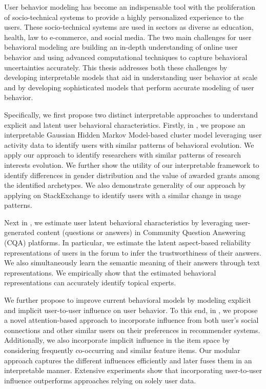 User behavior modeling has become an indispensable tool with the proliferation of socio-technical systems to provide a highly personalized experience to the users. These socio-technical systems are used in sectors as diverse as education, health, law to e-commerce, and social media.
The two main challenges for user behavioral modeling are building an in-depth understanding of online user behavior and using advanced computational techniques to capture behavioral uncertainties accurately.
This thesis addresses both these challenges by developing interpretable models that aid in understanding user behavior at scale and by developing sophisticated models that perform accurate modeling of user behavior.

Specifically, we first propose two distinct interpretable approaches to understand explicit and latent user behavioral characteristics.
Firstly, in , we propose an interpretable Gaussian Hidden Markov Model-based cluster model leveraging user activity data to identify users with similar patterns of behavioral evolution. We apply our approach to identify researchers with similar patterns of research interests evolution.  We further show the utility of our interpretable framework to identify differences in gender distribution and the value of awarded grants among the identified archetypes. We also demonstrate generality of our approach by applying on StackExchange to identify users with a similar change in usage patterns.

Next in , we estimate user latent behavioral characteristics by leveraging user-generated content (questions or answers) in Community Question Answering (CQA) platforms. In particular, we estimate the latent aspect-based reliability representations of users in the forum to infer the trustworthiness of their answers. We also simultaneously learn the semantic meaning of their answers through text representations. We empirically show that the estimated behavioral representations can accurately identify topical experts.

We further propose to improve current behavioral models by modeling explicit and implicit user-to-user influence on user behavior. To this end, in , we propose a novel attention-based approach to incorporate influence from both user's social connections and other similar users on their preferences in recommender systems. Additionally, we also incorporate implicit influence in the item space by considering frequently co-occurring and similar feature items. Our modular approach captures the different influences efficiently and later fuses them in an interpretable manner.
Extensive experiments show that incorporating user-to-user influence outperforms approaches relying on solely user data.

